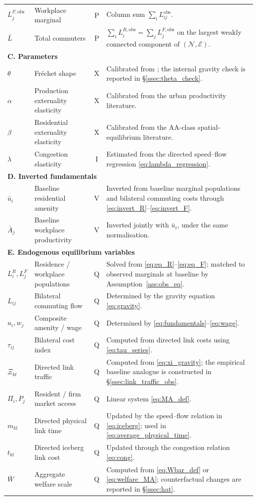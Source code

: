 \documentclass[12pt]{article}
\newcommand{\N}{\mathcal N}
\newcommand{\E}{\mathcal E}
\newcommand{\Lbar}{\bar L}
\newcommand{\Wbar}{\bar W}
\newcommand{\ubar}{\bar u}
\newcommand{\Abar}{\bar A}
\newcommand{\tkl}{t_{kl}}
\newcommand{\tijk}{\tau_{ij}}
\newcommand{\obs}{\mathrm{obs}}
\begin{document}
\begin{small}
\begin{longtable}{p{2.0cm}p{4.2cm}cp{6.5cm}}
$L_j^{F,\obs}$ & Workplace marginal & P & Column sum $\sum_i L_{ij}^{\obs}$.\\
$\Lbar$ & Total commuters & P & $\sum_i L_i^{R,\obs}=\sum_j L_j^{F,\obs}$ on the largest weakly connected component of $(\N,\E)$.\\
\midrule
\multicolumn{4}{l}{\textbf{C. Parameters}}\\
$\theta$ & Fr\'echet shape & X & Calibrated from \citet{Ahlfeldt2015}; the internal gravity check is reported in \S\ref{ssec:theta_check}.\\
$\alpha$ & Production externality elasticity & X & Calibrated from the urban productivity literature.\\
$\beta$ & Residential externality elasticity & X & Calibrated from the AA-class spatial-equilibrium literature.\\
$\lambda$ & Congestion elasticity & I & Estimated from the directed speed--flow regression \eqref{eq:lambda_regression}.\\
\midrule
\multicolumn{4}{l}{\textbf{D. Inverted fundamentals}}\\
$\ubar_i$ & Baseline residential amenity & V & Inverted from baseline marginal populations and bilateral commuting costs through \eqref{eq:invert_R}--\eqref{eq:invert_F}.\\
$\Abar_j$ & Baseline workplace productivity & V & Inverted jointly with $\ubar_i$, under the same normalisation.\\
\midrule
\multicolumn{4}{l}{\textbf{E. Endogenous equilibrium variables}}\\
$L_i^R, L_j^F$ & Residence / workplace populations & Q & Solved from \eqref{eq:eq_R}--\eqref{eq:eq_F}; matched to observed marginals at baseline by Assumption~\ref{ass:obs_eq}.\\
$L_{ij}$ & Bilateral commuting flow & Q & Determined by the gravity equation \eqref{eq:gravity}.\\
$u_i,w_j$ & Composite amenity / wage & Q & Determined by \eqref{eq:fundamentals}--\eqref{eq:wage}.\\
$\tijk$ & Bilateral cost index & Q & Computed from directed link costs using \eqref{eq:tau_series}.\\
$\Xi_{kl}$ & Directed link traffic & Q & Computed from \eqref{eq:xi_gravity}; the empirical baseline analogue is constructed in \S\ref{ssec:link_traffic_obs}.\\
$\Pi_i, P_j$ & Resident / firm market access & Q & Linear system \eqref{eq:MA_def}.\\
$m_{kl}$ & Directed physical link time & Q & Updated by the speed--flow relation in \eqref{eq:iceberg}; used in \eqref{eq:average_physical_time}.\\
$\tkl$ & Directed iceberg link cost & Q & Updated through the congestion relation \eqref{eq:cong}.\\
$\Wbar$ & Aggregate welfare scale & Q & Computed from \eqref{eq:Wbar_def} or \eqref{eq:welfare_MA}; counterfactual changes are reported in \S\ref{ssec:hat}.\\
\end{longtable}
\end{small}
\end{document}

